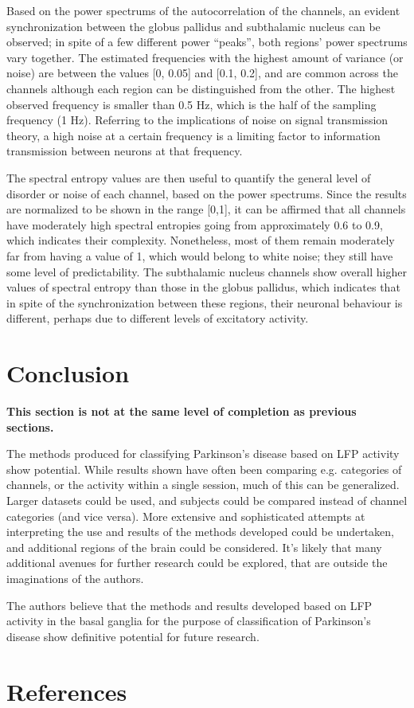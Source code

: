 \documentclass{article}
\begin{document}
Based on the power spectrums of the autocorrelation of the channels, an evident synchronization between the globus pallidus and subthalamic nucleus can be observed; in spite of a few different power “peaks”, both regions' power spectrums vary together. 
The estimated frequencies with the highest amount of variance (or noise) are between the values [0, 0.05] and [0.1, 0.2], and are common across the channels although each region can be distinguished from the other. 
The highest observed frequency is smaller than 0.5 Hz, which is the half of the sampling frequency (1 Hz). 
Referring to the implications of noise on signal transmission theory, a high noise at a certain frequency is a limiting factor to information transmission between neurons at that frequency. 

The spectral entropy values are then useful to quantify the general level of disorder or noise of each channel, based on the power spectrums. 
Since the results are normalized to be shown in the range [0,1], it can be affirmed that all channels have moderately high spectral entropies going from approximately 0.6 to 0.9, which indicates their complexity. 
Nonetheless, most of them remain moderately far from having a value of 1, which would belong to white noise; they still have some level of predictability. 
The subthalamic nucleus channels show overall higher values of spectral entropy than those in the globus pallidus, which indicates that in spite of the synchronization between these regions, their neuronal behaviour is different, perhaps due to different levels of excitatory activity.

\newpage
\section{Conclusion}

\textbf{This section is not at the same level of completion as previous sections.}

The methods produced for classifying Parkinson's disease based on LFP activity show potential.
While results shown have often been comparing e.g. categories of channels, or the activity within a single session, much of this can be generalized.
Larger datasets could be used, and subjects could be compared instead of channel categories (and vice versa).
More extensive and sophisticated attempts at interpreting the use and results of the methods developed could be undertaken, and additional regions of the brain could be considered.
It's likely that many additional avenues for further research could be explored, that are outside the imaginations of the authors.

The authors believe that the methods and results developed based on LFP activity in the basal ganglia for the purpose of classification of Parkinson's disease show definitive potential for future research.

\newpage
\section{References}

\end{document}
